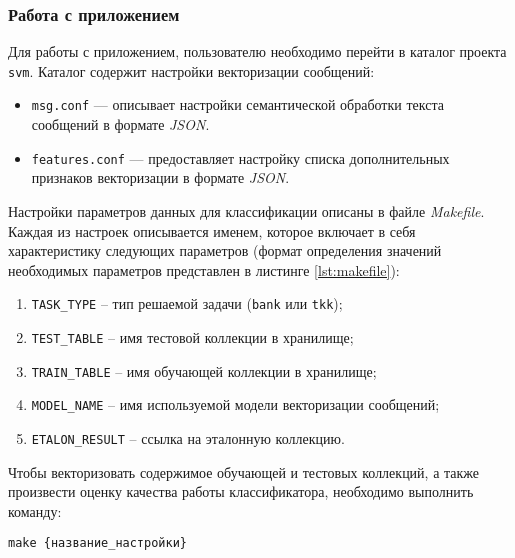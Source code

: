     \subsubsection{Работа с приложением}

        Для работы с приложением, пользователю необходимо перейти в каталог проекта {\tt svm}.
        Каталог содержит настройки векторизации сообщений:
        \begin{itemize}
            \item {\tt msg.conf} --- описывает настройки семантической обработки текста
                сообщений в формате {\it JSON}.
            \item {\tt features.conf} --- предоставляет настройку списка
                дополнительных признаков векторизации в формате {\it JSON}.
        \end{itemize}

        Настройки параметров данных для классификации описаны в файле {\it Makefile}.
        Каждая из настроек описывается именем, которое включает в себя
        характеристику следующих параметров (формат определения значений необходимых
        параметров представлен в листинге \ref{lst:makefile}):

        \begin{enumerate}
            \item {\tt TASK\_TYPE} -- тип решаемой задачи ({\tt bank} или {\tt tkk});
            \item {\tt TEST\_TABLE} -- имя тестовой коллекции в хранилище;
            \item {\tt TRAIN\_TABLE} -- имя обучающей коллекции в хранилище;
            \item {\tt MODEL\_NAME} -- имя используемой модели векторизации сообщений;
            \item {\tt ETALON\_RESULT} -- ссылка на эталонную коллекцию.
        \end{enumerate}

        \lstset{style=bash}
        

        Чтобы векторизовать содержимое обучающей и тестовых коллекций, а также
        произвести оценку качества работы классификатора, необходимо выполнить
        команду:
        \begin{center}
            {\tt make {\{название\_настройки\}}}
        \end{center}

